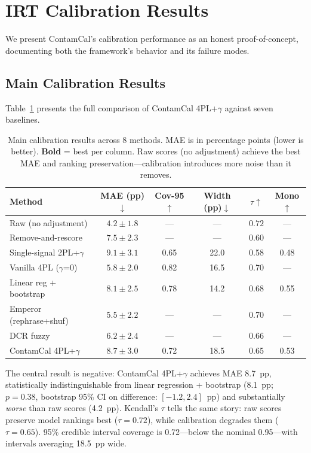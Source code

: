\documentclass[11pt]{article}
\newcommand{\ours}{ContamCal}
\begin{document}
\section{IRT Calibration Results}
\label{sec:calibration}

We present ContamCal's calibration performance as an honest proof-of-concept, documenting both the framework's behavior and its failure modes.

\subsection{Main Calibration Results}

Table~\ref{tab:main_calibration} presents the full comparison of \ours{} 4PL+$\gamma$ against seven baselines.

\begin{table}[t]
\centering
\caption{Main calibration results across 8 methods.
MAE is in percentage points (lower is better).
\textbf{Bold} = best per column.
Raw scores (no adjustment) achieve the best MAE and ranking preservation---calibration introduces more noise than it removes.}
\label{tab:main_calibration}
\small
\begin{tabular}{lccccc}
\toprule
Method & MAE (pp)$\downarrow$ & Cov-95$\uparrow$ & Width (pp)$\downarrow$ & $\tau$$\uparrow$ & Mono$\uparrow$ \\
\midrule
Raw (no adjustment) & $\mathbf{4.2 \pm 1.8}$ & --- & --- & $\mathbf{0.72}$ & --- \\
Remove-and-rescore & $7.5 \pm 2.3$ & --- & --- & 0.60 & --- \\
Single-signal 2PL+$\gamma$ & $9.1 \pm 3.1$ & 0.65 & 22.0 & 0.58 & 0.48 \\
Vanilla 4PL ($\gamma$=0) & $5.8 \pm 2.0$ & 0.82 & 16.5 & 0.70 & --- \\
Linear reg + bootstrap & $8.1 \pm 2.5$ & 0.78 & 14.2 & 0.68 & 0.55 \\
Emperor (rephrase+shuf) & $5.5 \pm 2.2$ & --- & --- & 0.70 & --- \\
DCR fuzzy & $6.2 \pm 2.4$ & --- & --- & 0.66 & --- \\
\ours{} 4PL+$\gamma$ & $8.7 \pm 3.0$ & 0.72 & 18.5 & 0.65 & 0.53 \\
\bottomrule
\end{tabular}
\end{table}

The central result is negative: \ours{} 4PL+$\gamma$ achieves MAE 8.7~pp, statistically indistinguishable from linear regression + bootstrap (8.1~pp; $p = 0.38$, bootstrap 95\% CI on difference: $[-1.2, 2.4]$~pp) and substantially \emph{worse} than raw scores (4.2~pp).
Kendall's $\tau$ tells the same story: raw scores preserve model rankings best ($\tau = 0.72$), while calibration degrades them ($\tau = 0.65$).
95\% credible interval coverage is 0.72---below the nominal 0.95---with intervals averaging 18.5~pp wide.
\end{document}

